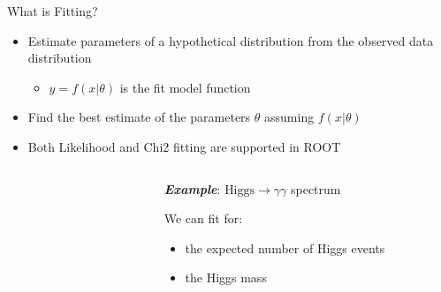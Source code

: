 \documentclass[aspectratio=169]{beamer}
\newcommand{\myfigure}[2]{
    \begin{figure}
        \makebox[\textwidth]{%
            \texttt{[image: \#2]}
        }
    \end{figure}
}
\begin{document}
\begin{frame}[fragile]{What is Fitting?}
\begin{itemize}
    \item{Estimate parameters of a hypothetical distribution from the observed data distribution}
    \begin{itemize}
        \item{$y = f(x|\theta)$ is the ﬁt model function}
    \end{itemize}
    \item{Find the best estimate of the parameters $\theta$ assuming $f(x|\theta)$}
    \item{Both Likelihood and Chi2 ﬁtting are supported in ROOT}
\end{itemize}


\begin{columns}
    \begin{column}{0.37\textwidth}
        \myfigure{0.9}{CMS-HIG-12-028_Figure_003.pdf}
    \end{column}
    \begin{column}{0.63\textwidth}
    \begin{center}
        \textbf{\textit{Example}}: $\text{Higgs}\to \gamma\gamma$ spectrum
    \end{center}
        We can fit for:
        \begin{itemize}
            \item the expected number of Higgs events
            \item the Higgs mass
        \end{itemize}
    \end{column}
\end{columns}


\end{frame}
\end{document}
